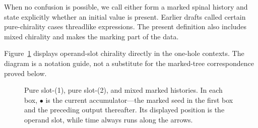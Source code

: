 When no confusion is possible, we call either form a marked spinal history and
state explicitly whether an initial value is present.  Earlier drafts called
certain pure-chirality cases threadlike expressions.  The present definition
also includes mixed chirality and makes the marking part of the data.

Figure~\ref{fig:slot-chirality-histories} displays operand-slot chirality
directly in the one-hole contexts.  The diagram is a notation guide, not a
substitute for the marked-tree correspondence proved below.

\begin{figure}[t]
\centering
{}
\caption{Pure slot-(1), pure slot-(2), and mixed marked histories.  In each
box, $\bullet$ is the current accumulator---the marked seed in the first box
and the preceding output thereafter.  Its displayed position is the operand
slot, while time always runs along the arrows.}
\label{fig:slot-chirality-histories}
\end{figure}

